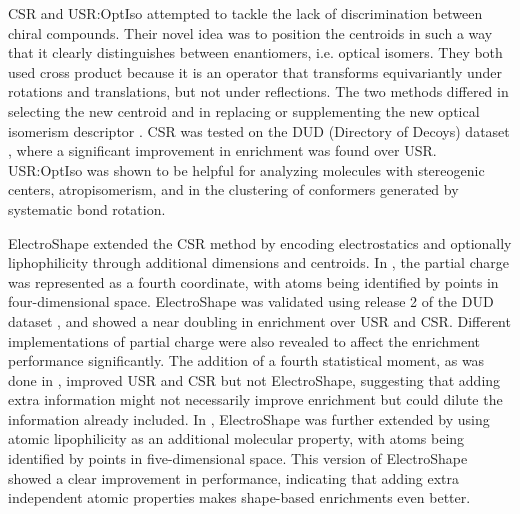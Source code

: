 CSR \citep{1334} and USR:OptIso \citep{1335} attempted to tackle the lack of discrimination between chiral compounds. Their novel idea was to position the centroids in such a way that it clearly distinguishes between enantiomers, i.e. optical isomers. They both used cross product because it is an operator that transforms equivariantly under rotations and translations, but not under reflections. The two methods differed in selecting the new centroid and in replacing or supplementing the new optical isomerism descriptor \citep{1335}. CSR \citep{1334} was tested on the DUD (Directory of Decoys) dataset \citep{87}, where a significant improvement in enrichment was found over USR. USR:OptIso \citep{1335} was shown to be helpful for analyzing molecules with stereogenic centers, atropisomerism, and in the clustering of conformers generated by systematic bond rotation.

ElectroShape \citep{1337,1338} extended the CSR method by encoding electrostatics and optionally liphophilicity through additional dimensions and centroids. In \citep{1337}, the partial charge was represented as a fourth coordinate, with atoms being identified by points in four-dimensional space. ElectroShape was validated using release 2 of the DUD dataset \citep{87}, and showed a near doubling in enrichment over USR and CSR. Different implementations of partial charge were also revealed to affect the enrichment performance significantly. The addition of a fourth statistical moment, as was done in \citep{1333}, improved USR and CSR but not ElectroShape, suggesting that adding extra information might not necessarily improve enrichment but could dilute the information already included. In \citep{1338}, ElectroShape was further extended by using atomic lipophilicity as an additional molecular property, with atoms being identified by points in five-dimensional space. This version of ElectroShape showed a clear improvement in performance, indicating that adding extra independent atomic properties makes shape-based enrichments even better.

